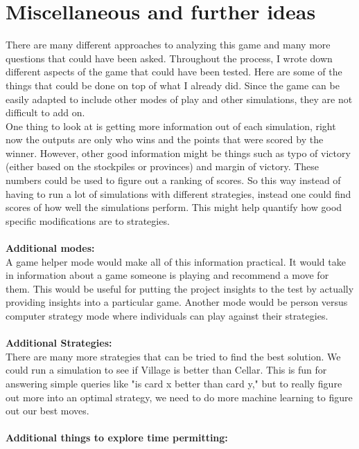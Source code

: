 \documentclass[11pt, oneside]{article}   	%
\begin{document}
\section{Miscellaneous and further ideas}

There are many different approaches to analyzing this game and many more questions that could have been asked. Throughout the process, I wrote down different aspects of the game that could have been tested. Here are some of the things that could be done on top of what I already did. Since the game can be easily adapted to include other modes of play and other simulations, they are not difficult to add on. \\

One thing to look at is getting more information out of each simulation, right now the outputs are only who wins and the points that were scored by the winner. However, other good information might be things such as typo of victory (either based on the stockpiles or provinces) and margin of victory. These numbers could be used to figure out a ranking of scores. So this way instead of having to run a lot of simulations with different strategies, instead one could find scores of how well the simulations perform. This might help quantify how good specific modifications are to strategies. 
\\
\\
\textbf{Additional modes:}\\
A game helper mode would make all of this information practical. It would take in information about a game someone is playing and recommend a move for them. This would be useful for putting the project insights to the test by actually providing insights into a particular game. Another mode would be person versus computer strategy mode where individuals can play against their strategies. 
\\
\\
\textbf{Additional Strategies:}\\
There are many more strategies that can be tried to find the best solution. We could run a simulation to see if Village is better than Cellar. This is fun for answering simple queries like "is card x better than card y," but to really figure out more into an optimal strategy, we need to do more machine learning to figure out our best moves. 
\\
\\
\textbf{Additional things to explore time permitting:}\\
\end{document}
